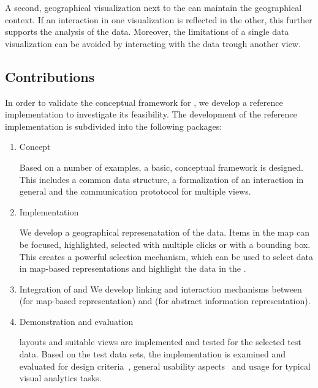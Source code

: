 A second, geographical visualization next to the \tmap{} can maintain the geographical context.
If an interaction in one visualization is reflected in the other, this further supports the analysis of the data.
Moreover, the limitations of a single data visualization can be avoided by interacting with the data trough another view.


\subsection{Contributions}

In order to validate the conceptual framework for \cmvs{}, we develop a reference implementation to investigate its feasibility.
The development of the reference implementation is subdivided into the following packages:

\begin{enumerate}
  \item
    Concept

    Based on a number of examples, a basic, conceptual framework is designed.
    This includes a common data structure, a formalization of an interaction in general and the communication prototocol for multiple views.

  \item
    Implementation

    We develop a geographical represenatation of the data.
    Items in the map can be focused, highlighted, selected with multiple clicks or with a bounding box.
    This creates a powerful selection mechanism, which can be used to select data in map-based representations and highlight the data in the \tmap{}.

  \item
    Integration of \tmap{} and \map{}
    We develop linking and interaction mechanisms between \maps{} (for map-based representation) and \tmaps{} (for abstract information representation).

  \item
    Demonstration and evaluation

    \cmv{} layouts and suitable views are implemented and tested for the selected test data.
    Based on the test data sets, the \cmv{} implementation is examined and evaluated for design criteria~\cite{Baldonado2000}, general usability aspects~\cite{Roberts2007} and usage for typical visual analytics tasks.
\end{enumerate}

